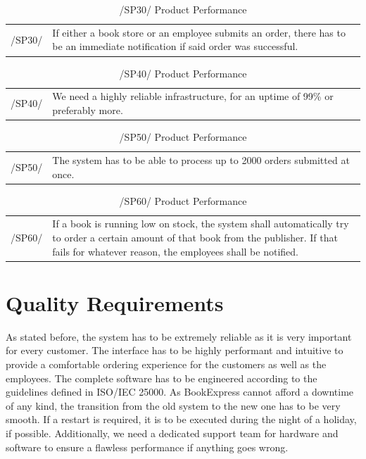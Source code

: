 \documentclass[11pt,a4paper,oneside,svgnames]{report}
\begin{document}
\begin{table}[H]
\centering
\begin{tabular}{p{1.5cm}p{11cm}}
\cellcolor{white}/SP30/ & If either a book store or an employee submits an order, there has to be an immediate notification if said order was successful.\\
\end{tabular}
\caption{/SP30/ Product Performance}
\end{table}

\begin{table}[H]
\centering
\begin{tabular}{p{1.5cm}p{11cm}}
\cellcolor{white}/SP40/ & We need a highly reliable infrastructure, for an uptime of 99\% or preferably more. \\
\end{tabular}
\caption{/SP40/ Product Performance}
\end{table}

\begin{table}[H]
\centering
\begin{tabular}{p{1.5cm}p{11cm}}
\cellcolor{white}/SP50/ & The system has to be able to process up to 2000 orders submitted at once. \\
\end{tabular}
\caption{/SP50/ Product Performance}
\end{table}

\begin{table}[H]
\centering
\begin{tabular}{p{1.5cm}p{11cm}}
\cellcolor{white}/SP60/ & If a book is running low on stock, the system shall automatically try to order a certain amount of that book from the publisher.  If that fails for whatever reason, the employees shall be notified. \\
\end{tabular}
\caption{/SP60/ Product Performance}
\end{table}

\chapter{Quality Requirements}
As stated before, the system has to be extremely reliable as it is very important for every customer. The interface has to be highly performant and intuitive to provide a comfortable ordering experience for the customers as well as the employees. The complete software has to be engineered according to the guidelines defined in ISO/IEC 25000. As BookExpress cannot afford a downtime of any kind, the transition from the old system to the new one has to be very smooth. If a restart is required, it is to be executed during the night of a holiday, if possible. Additionally, we need a dedicated support team for hardware and software to ensure a flawless performance if anything goes wrong.
\end{document}
